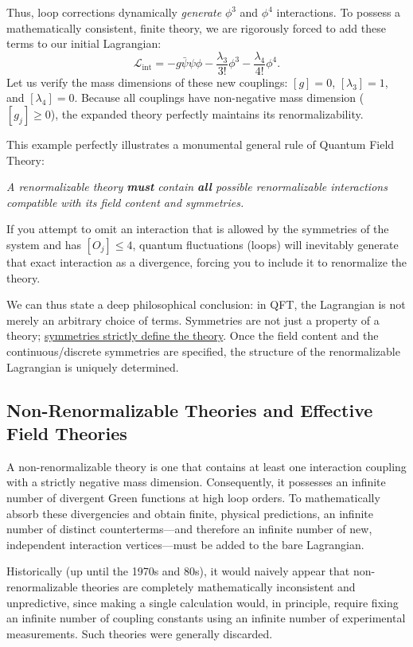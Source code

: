 \begin{example}
    Thus, loop corrections dynamically \textit{generate} $\phi^3$ and $\phi^4$ interactions. To possess a mathematically consistent, finite theory, we are rigorously forced to add these terms to our initial Lagrangian:
    \[
        \mathcal{L}_{\text{int}} = -g \bar{\psi} \psi \phi - \frac{\lambda_3}{3!} \phi^3 - \frac{\lambda_4}{4!} \phi^4.
    \]
    Let us verify the mass dimensions of these new couplings: $[g] = 0$, $[\lambda_3] = 1$, and $[\lambda_4] = 0$. Because all couplings have non-negative mass dimension ($[g_j] \geq 0$), the expanded theory perfectly maintains its renormalizability.
\end{example}

This example perfectly illustrates a monumental general rule of Quantum Field Theory:
\begin{center}
    \textit{A renormalizable theory \textbf{must} contain \textbf{all} possible renormalizable interactions compatible with its field content and symmetries.}
\end{center}
If you attempt to omit an interaction that is allowed by the symmetries of the system and has $[O_j] \leq 4$, quantum fluctuations (loops) will inevitably generate that exact interaction as a divergence, forcing you to include it to renormalize the theory.

We can thus state a deep philosophical conclusion: in QFT, the Lagrangian is not merely an arbitrary choice of terms. Symmetries are not just a property of a theory; \uline{symmetries strictly define the theory}. Once the field content and the continuous/discrete symmetries are specified, the structure of the renormalizable Lagrangian is uniquely determined.

\subsection{Non-Renormalizable Theories and Effective Field Theories}

A non-renormalizable theory is one that contains at least one interaction coupling with a strictly negative mass dimension. Consequently, it possesses an infinite number of divergent Green functions at high loop orders. To mathematically absorb these divergencies and obtain finite, physical predictions, an infinite number of distinct counterterms—and therefore an infinite number of new, independent interaction vertices—must be added to the bare Lagrangian.

Historically (up until the 1970s and 80s), it would naively appear that non-renormalizable theories are completely mathematically inconsistent and unpredictive, since making a single calculation would, in principle, require fixing an infinite number of coupling constants using an infinite number of experimental measurements. Such theories were generally discarded.

